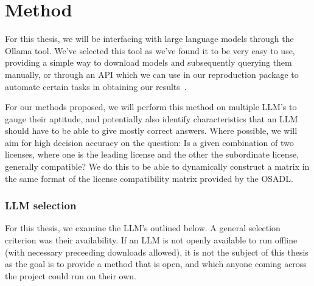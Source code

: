 
\chapter{Method}\label{ch:method}

For this thesis, we will be interfacing with large language models through the Ollama tool. We've selected this tool as we've found it to be very easy to use, providing a simple way to download models and subsequently querying them manually, or through an API which we can use in our reproduction package to automate certain tasks in obtaining our results~\cite{ollama_docs}.

For our methods proposed, we will perform this method on multiple LLM's to gauge their aptitude, and potentially also identify characteristics that an LLM should have to be able to give mostly correct answers. Where possible, we will aim for high decision accuracy on the question: Is a given combination of two licenses, where one is the leading license and the other the subordinate license, generally compatible? We do this to be able to dynamically construct a matrix in the same format of the license compatibility matrix provided by the OSADL.

\subsection{LLM selection}

For this thesis, we examine the LLM's outlined below. A general selection criterion was their availability. If an LLM is not openly available to run offline (with necessary preceeding downloads allowed), it is not the subject of this thesis as the goal is to provide a method that is open, and which anyone coming across the project could run on their own.

